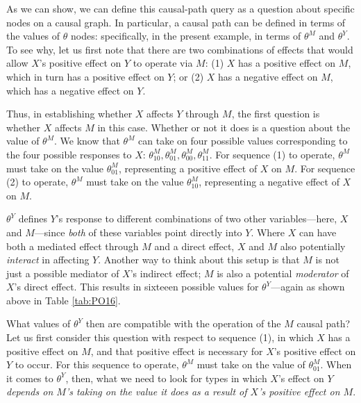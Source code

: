 \documentclass[
  12pt,
]{book}
\begin{document}
As we can show, we can define this causal-path query as a question about specific nodes on a causal graph. In particular, a causal path can be defined in terms of the values of \(\theta\) nodes: specifically, in the present example, in terms of \(\theta^M\) and \(\theta^Y\). To see why, let us first note that there are two combinations of effects that would allow \(X\)'s positive effect on \(Y\) to operate via \(M\): (1) \(X\) has a positive effect on \(M\), which in turn has a positive effect on \(Y\); or (2) \(X\) has a negative effect on \(M\), which has a negative effect on \(Y\).

Thus, in establishing whether \(X\) affects \(Y\) through \(M\), the first question is whether \(X\) affects \(M\) in this case. Whether or not it does is a question about the value of \(\theta^M\). We know that \(\theta^M\) can take on four possible values corresponding to the four possible responses to \(X\): \(\theta^M_{10}, \theta^M_{01}, \theta^M_{00}, \theta^M_{11}\). For sequence (1) to operate, \(\theta^M\) must take on the value \(\theta^M_{01}\), representing a positive effect of \(X\) on \(M\). For sequence (2) to operate, \(\theta^M\) must take on the value \(\theta^M_{10}\), representing a negative effect of \(X\) on \(M\).

\(\theta^Y\) defines \(Y\)'s response to different combinations of two other variables---here, \(X\) and \(M\)---since \emph{both} of these variables point directly into \(Y\). Where \(X\) can have both a mediated effect through \(M\) and a direct effect, \(X\) and \(M\) also potentially \emph{interact} in affecting \(Y\). Another way to think about this setup is that \(M\) is not just a possible mediator of \(X\)'s indirect effect; \(M\) is also a potential \emph{moderator} of \(X\)'s direct effect. This results in sixteeen possible values for \(\theta^Y\)---again as shown above in Table \ref{tab:PO16}.

What values of \(\theta^Y\)
then are compatible with the operation of the \(M\) causal path? Let us first consider this question with respect to sequence (1), in which \(X\) has a positive effect on \(M\), and that positive effect is necessary for \(X\)'s positive effect on \(Y\) to occur. For this sequence to operate, \(\theta^M\) must take on the value of \(\theta^M_{01}\). When it comes to \(\theta^Y\), then, what we need to look for types in which \(X\)'s effect on \(Y\) \emph{depends on \(M\)'s taking on the value it does as a result of \(X\)'s positive effect on \(M\)}.
\end{document}
